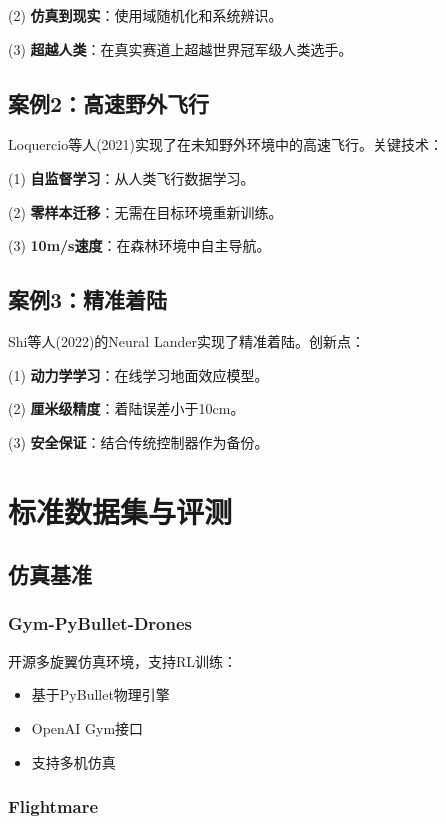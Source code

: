 (2) \textbf{仿真到现实}：使用域随机化和系统辨识。

(3) \textbf{超越人类}：在真实赛道上超越世界冠军级人类选手。

\subsection{案例2：高速野外飞行}

Loquercio等人(2021)实现了在未知野外环境中的高速飞行。关键技术：

(1) \textbf{自监督学习}：从人类飞行数据学习。

(2) \textbf{零样本迁移}：无需在目标环境重新训练。

(3) \textbf{10m/s速度}：在森林环境中自主导航。

\subsection{案例3：精准着陆}

Shi等人(2022)的Neural Lander实现了精准着陆。创新点：

(1) \textbf{动力学学习}：在线学习地面效应模型。

(2) \textbf{厘米级精度}：着陆误差小于10cm。

(3) \textbf{安全保证}：结合传统控制器作为备份。

\section{标准数据集与评测}\label{sec:benchmarks}

\subsection{仿真基准}

\subsubsection{Gym-PyBullet-Drones}

开源多旋翼仿真环境，支持RL训练：
\begin{itemize}
    \item 基于PyBullet物理引擎
    \item OpenAI Gym接口
    \item 支持多机仿真
\end{itemize}

\subsubsection{Flightmare}

